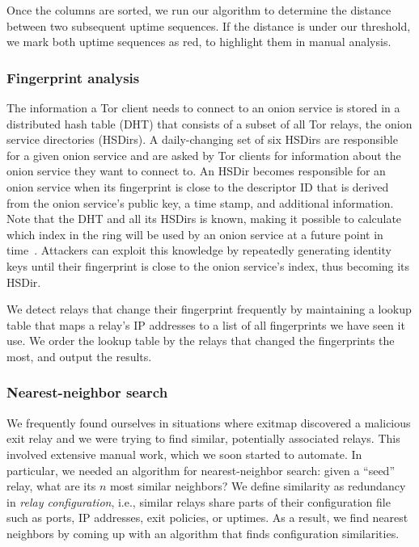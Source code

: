 Once the columns are sorted, we run our algorithm to determine the distance
between two subsequent uptime sequences.  If the distance is under our
threshold, we mark both uptime sequences as red, to highlight them in manual
analysis.

\subsubsection{Fingerprint analysis}
\label{sec:fingerprint-analysis}
The information a Tor client needs to connect to an onion service is stored in a
distributed hash table (DHT) that consists of a subset of all Tor
relays, the onion service directories (HSDirs).  A daily-changing set of six
HSDirs are responsible for a given onion service and are asked by Tor clients
for information about the onion service they want to connect to.  An HSDir
becomes responsible for an onion service when its fingerprint is close to the
descriptor ID that is derived from the onion service's public key, a time stamp,
and additional information.
Note that the DHT and all its HSDirs is known, making it possible to calculate
which index in the ring will be used by an onion service at a future point in
time~\cite{Biryukov2013a}.  Attackers can exploit this knowledge by repeatedly
generating identity keys until their fingerprint is close to the onion service's
index, thus becoming its HSDir.

We detect relays that change their fingerprint frequently by maintaining a
lookup table that maps a relay's IP addresses to a list of all fingerprints we
have seen it use.  We order the lookup table by the relays that changed the
fingerprints the most, and output the results.

\subsubsection{Nearest-neighbor search}
\label{sec:nearest-neighbor}
We frequently found ourselves in situations where exitmap discovered a malicious
exit relay and we were trying to find similar, potentially associated relays.
This involved extensive manual work, which we soon started to automate.  In
particular, we needed an algorithm for nearest-neighbor search: given a ``seed''
relay, what are its $n$ most similar neighbors?  We define similarity as
redundancy in \emph{relay configuration}, i.e., similar relays share parts of
their configuration file such as ports, IP addresses, exit policies, or uptimes.
As a result, we find nearest neighbors by coming up with an algorithm that finds
configuration similarities.

